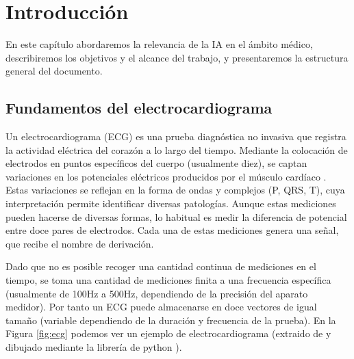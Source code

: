 \chapter{Introducción}
\label{cap:introduccion}
\begin{resumen}
	En este capítulo abordaremos la relevancia de la IA en el ámbito médico, describiremos los objetivos y el alcance del trabajo, y presentaremos la estructura general del documento.
\end{resumen}

\section{Fundamentos del electrocardiograma}
Un electrocardiograma (ECG) es una prueba diagnóstica no invasiva que registra la actividad eléctrica del corazón a lo largo del tiempo. Mediante la colocación de electrodos en puntos específicos del cuerpo (usualmente diez), se captan variaciones en los potenciales eléctricos producidos por el músculo cardíaco \citep{ribeiro}. Estas variaciones se reflejan en la forma de ondas y complejos (P, QRS, T), cuya interpretación permite identificar diversas patologías. Aunque estas mediciones pueden hacerse de diversas formas, lo habitual es medir la diferencia de potencial entre doce pares de electrodos. Cada una de estas mediciones genera una señal, que recibe el nombre de derivación.

Dado que no es posible recoger una cantidad continua de mediciones en el tiempo, se toma una cantidad de mediciones finita a una frecuencia específica (usualmente de 100Hz a 500Hz, dependiendo de la precisión del aparato medidor). Por tanto un ECG puede almacenarse en doce vectores de igual tamaño (variable dependiendo de la duración y frecuencia de la prueba). En la Figura \ref{fig:ecg} podemos ver un ejemplo de electrocardiograma (extraido de \cite{ptbxldb} y dibujado mediante la librería de python \emph{}).

